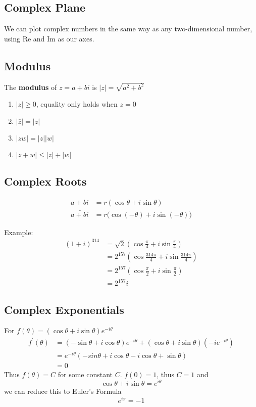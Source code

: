 \documentclass[12pt]{article}
\begin{document}
\subsection*{Complex Plane}
We can plot complex numbers in the same way as any two-dimensional number, using Re and Im as our axes.

\subsection*{Modulus}
The {\bf modulus} of $z = a + bi$ is $|z| = \sqrt{a^2+b^2}$

\begin{enumerate}
\item $|z| \geq 0$, equality only holds when $z = 0$
\item $|\bar{z}| = |z|$
\item $|zw| = |z||w|$
\item $|z + w| \leq |z| + |w|$
\end{enumerate}

\subsection*{Complex Roots}
\begin{align*}
a + bi &= r(\cos\theta + i\sin\theta)\\
\bar{a+bi} &= r\bigl(\cos(-\theta) + i\sin(-\theta)\bigl)
\end{align*}

Example:
\begin{align*}
(1 + i)^{314} &= \sqrt{2}(\cos\frac{\pi}{4} + i\sin\frac{\pi}{4})\\
&= 2^{157}(\cos\frac{314\pi}{4} + i\sin\frac{314\pi}{4})\\
&= 2^{157}(\cos\frac{\pi}{2} + i\sin\frac{\pi}{2})\\
&= 2^{157}i
\end{align*}

\subsection*{Complex Exponentials}
For $f(\theta) = (\cos\theta + i\sin\theta)e^{-i\theta}$
\begin{align*}
f^\prime(\theta) &= (-\sin\theta + i\cos\theta)e^{-i\theta} + (\cos\theta + i\sin\theta)(-ie^{-i\theta})\\
&= e^{-i\theta}(-sin\theta + i\cos\theta - i\cos\theta + \sin\theta)\\
&= 0
\end{align*}
Thus $f(\theta) = C$ for some constant $C$. $f(0) = 1$, thus $C = 1$ and \[ \cos\theta + i\sin\theta = e^{i\theta} \] we can reduce this to Euler's Formula \[ e^{i\pi} = -1 \]
\end{document}
